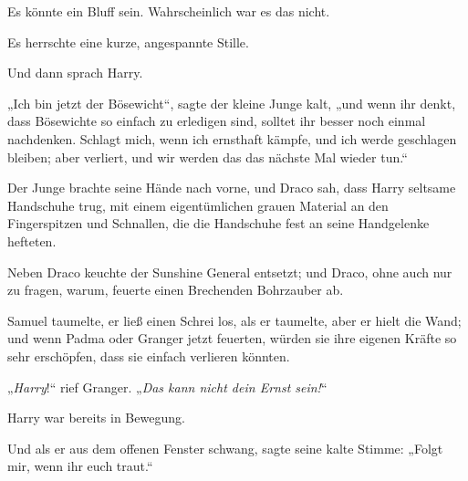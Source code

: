 Es könnte ein Bluff sein. Wahrscheinlich war es das nicht.

Es herrschte eine kurze, angespannte Stille.

Und dann sprach Harry.

„Ich bin jetzt der Bösewicht“, sagte der kleine Junge kalt, „und wenn ihr denkt, dass Bösewichte so einfach zu erledigen sind, solltet ihr besser noch einmal nachdenken. Schlagt mich, wenn ich ernsthaft kämpfe, und ich werde geschlagen bleiben; aber verliert, und wir werden das das nächste Mal wieder tun.“

Der Junge brachte seine Hände nach vorne, und Draco sah, dass Harry seltsame Handschuhe trug, mit einem eigentümlichen grauen Material an den Fingerspitzen und Schnallen, die die Handschuhe fest an seine Handgelenke hefteten.

Neben Draco keuchte der Sunshine General entsetzt; und Draco, ohne auch nur zu fragen, warum, feuerte einen Brechenden Bohrzauber ab.

Samuel taumelte, er ließ einen Schrei los, als er taumelte, aber er hielt die Wand; und wenn Padma oder Granger jetzt feuerten, würden sie ihre eigenen Kräfte so sehr erschöpfen, dass sie einfach verlieren könnten.

„\emph{Harry}!“ rief Granger.
„\emph{Das kann nicht dein Ernst sein!}“

Harry war bereits in Bewegung.

Und als er aus dem offenen Fenster schwang, sagte seine kalte Stimme:
„Folgt mir, wenn ihr euch traut.“


